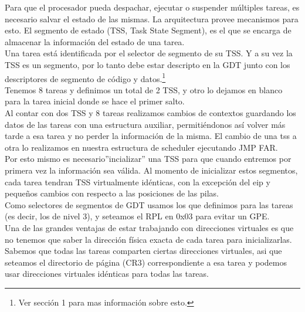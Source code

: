 Para que el procesador pueda despachar, ejecutar o suspender m\'ultiples tareas, es necesario salvar el estado de las mismas. La 
arquitectura provee mecanismos para esto. El segmento de estado (TSS, Task State Segment), es el que se encarga de almacenar la 
informaci\'on del estado de una tarea.\\

Una tarea est\'a identificada por el selector de segmento de su TSS. Y a su vez la TSS es un segmento, por lo tanto debe estar descripto 
en la GDT junto con los descriptores de segmento de c\'odigo y datos.\footnote{Ver secci\'on 1 para mas informaci\'on sobre esto.}\\

Tenemos 8 tareas y definimos un total de 2 TSS, y otro lo 
dejamos en blanco para la tarea inicial donde se hace el primer salto.\\

Al contar con dos TSS y 8 tareas realizamos cambios de contextos guardando los datos de las tareas con una estructura auxiliar, permiti\'endonos as\'i volver m\'as tarde a esa tarea y no perder la informaci\'on de la 
misma. El cambio de una tss a otra lo realizamos en nuestra estructura de scheduler ejecutando JMP FAR.\\
Por esto mismo es necesario''incializar'' una TSS para que cuando entremos por primera vez la informaci\'on
sea v\'alida. Al momento de inicializar estos segmentos, cada tarea tendran TSS virtualmente id\'enticas, con la excepci\'on del
 eip y pequeños cambios con respecto a las posiciones de las pilas.\\

Como selectores de segmentos de GDT usamos los que definimos para las tareas (es decir, los de nivel 3), y seteamos el RPL en 0x03 para 
evitar un GPE.\\

Una de las grandes ventajas de estar trabajando con direcciones virtuales es que no tenemos que saber la direcci\'on f\'isica exacta de
cada tarea para inicializarlas. Sabemos que todas las tareas comparten ciertas direcciones virtuales, asi que seteamos el directorio de 
p\'agina (CR3) correspondiente a esa tarea y podemos usar direcciones virtuales id\'enticas para todas las tareas. 
\\
